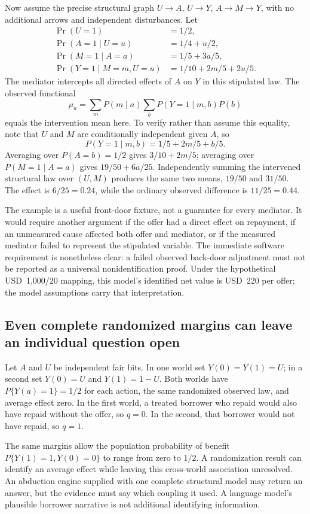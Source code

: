 Now assume the precise structural graph $U\to A$, $U\to Y$,
$A\to M\to Y$, with no additional arrows and independent disturbances.
Let
\begin{align*}
 \Pr(U=1)&=1/2,\\
 \Pr(A=1\mid U=u)&=1/4+u/2,\\
 \Pr(M=1\mid A=a)&=1/5+3a/5,\\
 \Pr(Y=1\mid M=m,U=u)&=1/10+2m/5+2u/5.
\end{align*}
The mediator intercepts all directed effects of $A$ on $Y$ in this stipulated
law. The observed functional
\[
 \mu_a=\sum_m P(m\mid a)\sum_b P(Y=1\mid m,b)P(b)
\]
equals the intervention mean here. To verify rather than assume this equality,
note that $U$ and $M$ are conditionally independent given $A$, so
\[
 P(Y=1\mid m,b)=1/5+2m/5+b/5.
\]
Averaging over $P(A=b)=1/2$ gives $3/10+2m/5$; averaging over
$P(M=1\mid A=a)$ gives $19/50+6a/25$.
Independently summing the intervened structural law over $(U,M)$ produces
the same two means, $19/50$ and $31/50$. The effect is $6/25=0.24$,
while the ordinary observed difference is $11/25=0.44$.

The example is a useful front-door fixture, not a guarantee for every mediator.
It would require another argument if the offer had a direct effect on repayment,
if an unmeasured cause affected both offer and mediator, or if the measured
mediator failed to represent the stipulated variable. The immediate software
requirement is nonetheless clear: a failed observed back-door adjustment must
not be reported as a universal nonidentification proof. Under the hypothetical
USD~1,000/20 mapping, this model's identified net value is USD~220 per offer;
the model assumptions carry that interpretation.

\subsection{Even complete randomized margins can leave an individual question open}

Let $A$ and $U$ be independent fair bits. In one world set
$Y(0)=Y(1)=U$; in a second set $Y(0)=U$ and $Y(1)=1-U$.
Both worlds have $P\{Y(a)=1\}=1/2$ for each action, the same randomized
observed law, and average effect zero. In the first world, a treated borrower
who repaid would also have repaid without the offer, so $q=0$. In the second,
that borrower would not have repaid, so $q=1$.

The same margins allow the population probability of benefit
$P\{Y(1)=1,Y(0)=0\}$ to range from zero to $1/2$. A randomization result
can identify an average effect while leaving this cross-world association
unresolved. An abduction engine supplied with one complete structural model
may return an answer, but the evidence must say which coupling it used. A
language model's plausible borrower narrative is not additional identifying
information.


